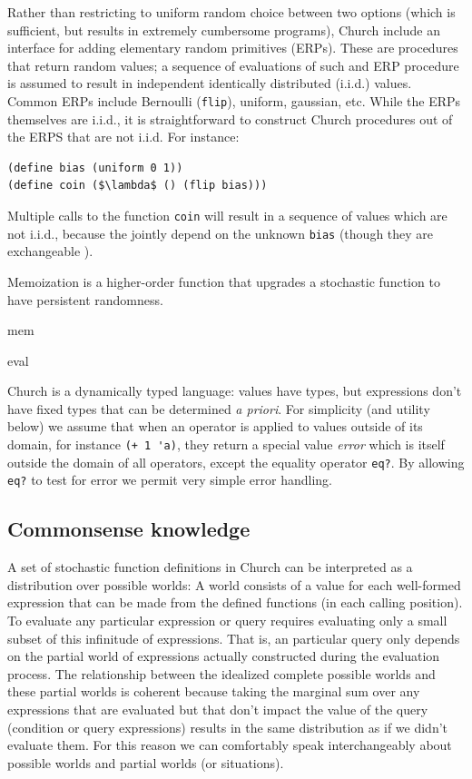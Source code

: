 \documentclass[12pt]{article}
\begin{document}
Rather than restricting to uniform random choice between two options (which is sufficient, but results in extremely cumbersome programs), Church include an interface for adding elementary random primitives (ERPs). These are procedures that return random values; a sequence of evaluations of such and ERP procedure is assumed to result in independent identically distributed (i.i.d.) values. Common ERPs include Bernoulli (\lstinline{flip}), uniform, gaussian, etc. While the ERPs themselves are i.i.d., it is straightforward to construct Church procedures out of the ERPS that are not i.i.d. For instance:
\begin{lstlisting}[mathescape]
(define bias (uniform 0 1))
(define coin ($\lambda$ () (flip bias)))
\end{lstlisting}
Multiple calls to the function \lstinline{coin} will result in a sequence of values which are not i.i.d., because the jointly depend on the unknown \lstinline{bias} (though they are exchangeable \cite{defintetti}).

Memoization is a higher-order function that upgrades a stochastic function to have persistent randomness. 

mem

eval






\label{bottom-val}
Church is a dynamically typed language: values have types, but expressions don't have fixed types that can be determined \emph{a priori}. For simplicity (and utility below) we assume that when an operator is applied to values outside of its domain, for instance \lstinline{(+ 1 'a)}, they return a special value \emph{error} which is itself outside the domain of all operators, except the equality operator \lstinline{eq?}. By allowing \lstinline{eq?} to test for error we permit very simple error handling.




\subsection{Commonsense knowledge}

A set of stochastic function definitions in Church can be interpreted as a distribution over possible worlds: A world consists of a value for each well-formed expression that can be made from the defined functions (in each calling position). 
To evaluate any particular expression or query requires evaluating only a small subset of this infinitude of expressions. 
That is, an particular query only depends on the partial world of expressions actually constructed during the evaluation process. 
The relationship between the idealized complete possible worlds and these partial worlds is coherent because taking the marginal sum over any expressions that are evaluated but that don't impact the value of the query (condition or query expressions) results in the same distribution as if we didn't evaluate them. 
For this reason we can comfortably speak interchangeably about possible worlds and partial worlds (or situations).
\end{document}
